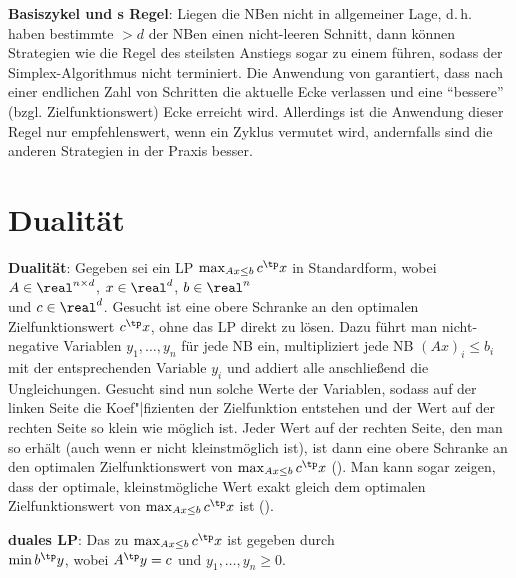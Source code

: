 \linie

\textbf{Basiszykel und s Regel}:
Liegen die NBen nicht in allgemeiner Lage, d.\,h. haben bestimmte $> d$ der NBen einen nicht-leeren
Schnitt, dann können Strategien wie die Regel des steilsten Anstiegs sogar zu einem
 führen, sodass der Simplex-Algorithmus nicht terminiert.
Die Anwendung von  garantiert, dass nach einer endlichen Zahl von
Schritten die aktuelle Ecke verlassen und eine "`bessere"' (bzgl. Zielfunktionswert) Ecke erreicht
wird.
Allerdings ist die Anwendung dieser Regel nur empfehlenswert, wenn ein Zyklus vermutet wird,
andernfalls sind die anderen Strategien in der Praxis besser.

\pagebreak

\section{%
    Dualität%
}

\textbf{Dualität}:
Gegeben sei ein LP $\max_{Ax \le b} c^\tp x$ in Standardform,
wobei $A \in \real^{n \times d}$, $x \in \real^d$, $b \in \real^n$\\
und $c \in \real^d$.
Gesucht ist eine obere Schranke an den optimalen Zielfunktionswert $c^\tp x$,
ohne das LP direkt zu lösen.
Dazu führt man nicht-negative Variablen $y_1, \dotsc, y_n$ für jede NB ein, multipliziert
jede NB $(Ax)_i \le b_i$ mit der entsprechenden Variable $y_i$
und addiert alle anschließend die Ungleichungen.
Gesucht sind nun solche Werte der Variablen, sodass auf der linken Seite die Koef"|fizienten
der Zielfunktion entstehen und der Wert auf der rechten Seite so klein wie möglich ist.
Jeder Wert auf der rechten Seite, den man so erhält (auch wenn er nicht kleinstmöglich ist),
ist dann eine obere Schranke an den optimalen Zielfunktionswert von
$\max_{Ax \le b} c^\tp x$
().
Man kann sogar zeigen, dass der optimale, kleinstmögliche Wert exakt gleich dem optimalen
Zielfunktionswert von $\max_{Ax \le b} c^\tp x$ ist ().

\textbf{duales LP}:
Das zu $\max_{Ax \le b} c^\tp x$  ist gegeben durch\\
$\min b^\tp y$, wobei $A^\tp y = c$ und $y_1, \dotsc, y_n \ge 0$.

\linie

